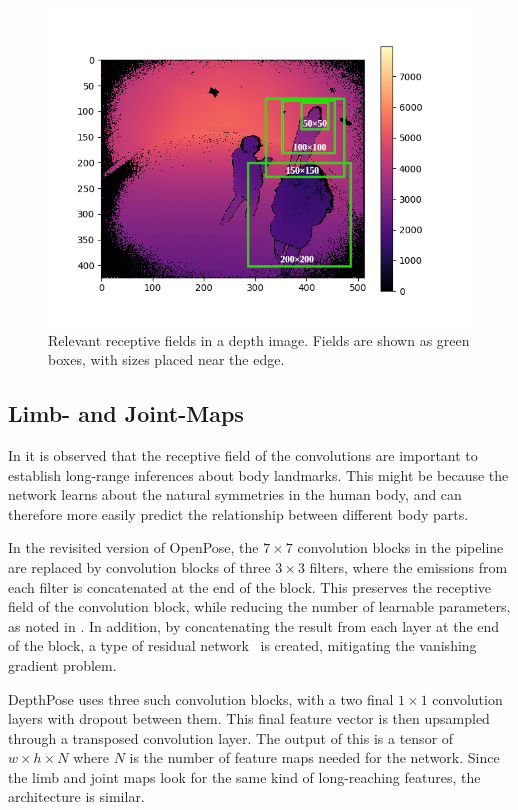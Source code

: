 \begin{figure}[h]
  \centering
  \includegraphics[width=.7\textwidth]{img/depth_image_receptive_fields}
  \caption[Receptive fields in depth images]{Relevant receptive fields in a depth image. Fields are shown as green boxes, with sizes placed near the edge.}
  \label{fig:depth_fields}
\end{figure}

\subsection{Limb- and Joint-Maps}

In \cite{cao2019openpose,wei2016cpm} it is observed that the receptive field of the convolutions are important to establish long-range inferences about body landmarks. This might be because the network learns about the natural symmetries in the human body, and can therefore more easily predict the relationship between different body parts.

In the revisited version of OpenPose, the $7 \times 7$ convolution blocks in the pipeline are replaced by convolution blocks of three $3 \times 3$ filters, where the emissions from each filter is concatenated at the end of the block. This preserves the receptive field of the convolution block, while reducing the number of learnable parameters, as noted in \cite{simonyan2015deep}. In addition, by concatenating the result from each layer at the end of the block, a type of residual network~\cite{he2015deep} is created, mitigating the vanishing gradient problem.

DepthPose uses three such convolution blocks, with a two final $1 \times 1$ convolution layers with dropout between them. This final feature vector is then upsampled through a transposed convolution layer. The output of this is a tensor of $w \times h \times N$ where $N$ is the number of feature maps needed for the network. Since the limb and joint maps look for the same kind of long-reaching features, the architecture is similar.

